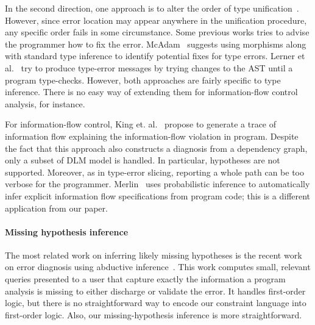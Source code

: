 In the second direction, one approach is to alter the order of type
unification~\cite{lee:toplas, mcadam:unification}. However, since
error location may appear anywhere in the unification procedure, any
specific order fails in some circumstance. Some previous works tries
to advise the programmer how to fix the error.
McAdam~\cite{mcadam:thesis} suggests using morphisms along with
standard type inference to identify potential fixes for type errors.
Lerner et al.~\cite{lerner:pldi07} try to produce type-error messages
by trying changes to the AST until a program type-checks.  However,
both approaches are fairly specific to type inference. There is no
easy way of extending them for information-flow control analysis, for
instance.

For information-flow control, King et. al.~\cite{king:fse} propose to
generate a trace of information flow explaining the information-flow
violation in program. Despite the fact that this approach also
constructs a diagnosis from a dependency graph, only a subset of DLM
model is handled. In particular, hypotheses are not supported.
Moreover, as in type-error slicing, reporting a whole path can be
too verbose for the programmer.  Merlin~\cite{livshits:merlin} uses
probabilistic inference to automatically infer explicit information
flow specifications from program code; this is a different
application from our paper.

\paragraph{Missing hypothesis inference}

The most related work on inferring likely missing hypotheses is the
recent work on error diagnosis using abductive
inference~\cite{dillig:pldi12}. This work computes small, relevant
queries presented to a user that capture exactly the information a
program analysis is missing to either discharge or validate the error.
It handles first-order logic, but there is no straightforward
way to encode our constraint language into first-order logic.
Also, our missing-hypothesis inference is more straightforward.






